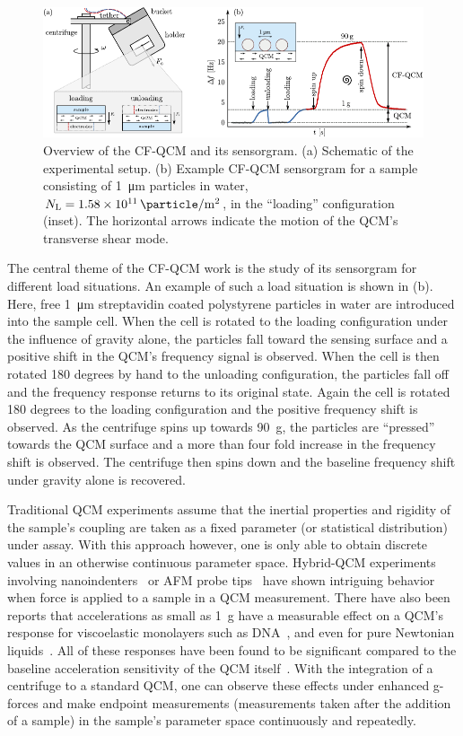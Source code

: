 \begin{figure}[ht]
\centering
\includegraphics[width=16cm,keepaspectratio]{qcm/figures/figure1.pdf}
\caption{Overview of the CF-QCM and its sensorgram.  (a) Schematic of the
experimental setup.  (b) Example CF-QCM sensorgram
for a sample consisting of \SI{1}{\micro\meter} particles in water,
$N_\mathrm{L}=\SI{1.58e11}{\particle\per\meter\squared}$, in the
``loading'' configuration (inset).  The horizontal arrows indicate the
motion of the QCM's transverse shear mode.  }
\label{fig:expsetup}
\end{figure}
The central theme of the CF-QCM work is the study of its sensorgram for
different load situations.  An example of such a load situation is shown in
(b).  Here, free \SI{1}{\micro\meter} streptavidin
coated polystyrene particles in water are introduced into the sample cell.
When the cell is rotated to the loading configuration under the influence
of gravity alone, the particles fall toward the sensing surface and a
positive shift in the QCM's frequency signal is observed.  When the cell is
then rotated 180 degrees by hand to the unloading configuration, the
particles fall off and the frequency response returns to its original
state.  Again the cell is rotated 180 degrees to the loading configuration
and the positive frequency shift is observed.  As the centrifuge spins up
towards \SI{90}{g}, the particles are ``pressed'' towards the QCM surface
and a more than four fold increase in the frequency shift is observed.  The
centrifuge then spins down and the baseline frequency shift under gravity
alone is recovered.

Traditional QCM experiments assume that the inertial properties and
rigidity of the sample's coupling are taken as a fixed parameter (or
statistical distribution) under assay.  With this approach however, one is
only able to obtain discrete values in an otherwise continuous parameter
space.  Hybrid-QCM experiments involving
nanoindenters~\cite{borovsky2001measuring} or AFM probe
tips~\cite{richter2003pathways} have shown intriguing behavior when force
is applied to a sample in a QCM measurement.  There have also been reports
that accelerations as small as \SI{1}{g} have a measurable effect on a
QCM's response for viscoelastic monolayers such as
DNA~\cite{fawcett2004evidence}, and even for pure Newtonian
liquids~\cite{yoshimoto2002effect}.  All of these responses have been found
to be significant compared to the baseline acceleration sensitivity of the
QCM itself~\cite{filler1988acceleration}.  With the integration of a
centrifuge to a standard QCM, one can observe these effects under enhanced
g-forces and make endpoint measurements (measurements taken after the
addition of a sample) in the sample's parameter space continuously and
repeatedly.

